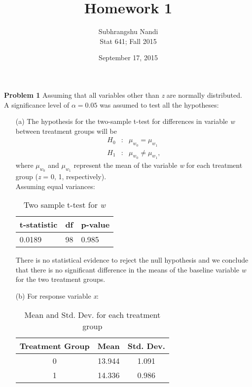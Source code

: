 \documentclass[11pt,a4paper]{article}
\begin{document}
\title{Homework 1}
\author{Subhrangshu Nandi\\
  Stat 641; Fall 2015}
\date{September 17, 2015}

\maketitle

\noindent
\textbf{Problem 1} Assuming that all variables other than \emph{z} are normally distributed.\\
A significance level of $\alpha=0.05$ was assumed to test all the hypotheses:

\begin{enumerate}
\item[(a)] The hypothesis for the two-sample t-test for differences in variable \emph{w} between treatment 
groups will be
\begin{eqnarray*}
  H_0 &:& \mu_{w_0} =\mu_{w_1}\\
  H_1 &:& \mu_{w_0} \neq \mu_{w_1},
\end{eqnarray*}
where $\mu_{w_0}$ and $\mu_{w_1}$ represent the mean of the variable \emph{w} for each treatment group (\emph{z} = 0, 1, respectively).\\
Assuming equal variances:
\begin{table}[h!]
\centering
\begin{tabular}{lll}
\hline
t-statistic & df & p-value\\
\hline
0.0189 & 98 & 0.985\\
\hline
\end{tabular}
\caption{Two sample t-test for \emph{w}}
\end{table}
There is no statistical evidence to reject the null hypothesis and we conclude that there is no significant difference 
in the means of the baseline variable \emph{w} for the two treatment groups.  

\item[(b)] For response variable \emph{x}:

\begin{table}[h!]
\centering
\begin{tabular}{ccc}
\hline
Treatment Group & Mean & Std. Dev.\\
\hline
 0 &13.944&  1.091\\
 1 &14.336 & 0.986\\
\hline
\end{tabular}
\caption{Mean and Std. Dev. for each treatment group}
\end{table}


\end{enumerate}
\end{document}
